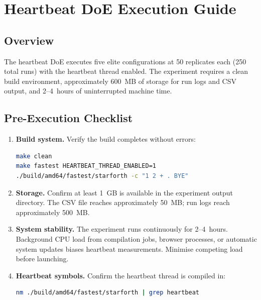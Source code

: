 
\section{Heartbeat DoE Execution Guide}
\label{sec:heartbeat-doe-execution}

\subsection{Overview}

The heartbeat DoE executes five elite configurations at 50 replicates each
(250 total runs) with the heartbeat thread enabled. The experiment requires
a clean build environment, approximately 600~MB of storage for run logs and
CSV output, and 2--4~hours of uninterrupted machine time.

\subsection{Pre-Execution Checklist}

\begin{enumerate}
  \item \textbf{Build system.} Verify the build completes without errors:
\begin{lstlisting}[language=bash]
make clean
make fastest HEARTBEAT_THREAD_ENABLED=1
./build/amd64/fastest/starforth -c "1 2 + . BYE"
\end{lstlisting}

  \item \textbf{Storage.} Confirm at least 1~GB is available in the experiment
        output directory. The CSV file reaches approximately 50~MB; run logs
        reach approximately 500~MB.

  \item \textbf{System stability.} The experiment runs continuously for
        2--4~hours. Background CPU load from compilation jobs, browser
        processes, or automatic system updates biases heartbeat measurements.
        Minimise competing load before launching.

  \item \textbf{Heartbeat symbols.} Confirm the heartbeat thread is compiled
        in:
\begin{lstlisting}[language=bash]
nm ./build/amd64/fastest/starforth | grep heartbeat
\end{lstlisting}
\end{enumerate}

